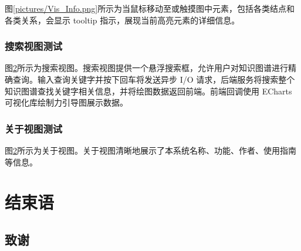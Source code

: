 \documentclass[a4paper,AutoFakeBold,oneside,12pt]{book}
\begin{document}

图\ref{pictures/Vis_Info.png}所示为当鼠标移动至或触摸图中元素，包括各类结点和各类关系，会显示 tooltip 指示，展现当前高亮元素的详细信息。


\subsection{搜索视图测试}

图\ref{}所示为搜索视图。搜索视图提供一个悬浮搜索框，允许用户对知识图谱进行精确查询。输入查询关键字并按下回车将发送异步 I/O 请求，后端服务将搜索整个知识图谱查找关键字相关信息，并将绘图数据返回前端。前端回调使用 ECharts 可视化库绘制力引导图展示数据。


\subsection{关于视图测试}

图\ref{}所示为关于视图。关于视图清晰地展示了本系统名称、功能、作者、使用指南等信息。


\chapter{结束语}


\begin{nopagenumber}
	\clearpage{}
	

	\clearpage
	\chapter{致\qquad{}谢}
	\normalsize\thankwords

\end{nopagenumber}

\blankmatter



\blankmatter

\end{document}
